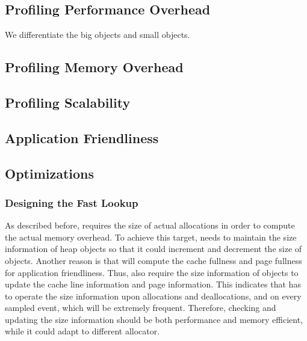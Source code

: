 \subsection{Profiling Performance Overhead}

We differentiate the big objects and small objects. 

\subsection{Profiling Memory Overhead}

\subsection{Profiling Scalability}

\subsection{Application Friendliness}

\subsection{Optimizations}

\subsubsection{Designing the Fast Lookup}

\label{sec:fastlookup}

As described before, \MP{} requires the size of actual allocations in order to compute the actual memory overhead. To achieve this target, \MP{} needs to maintain the size information of heap objects so that it could increment and decrement the size of objects. Another reason is that \MP{} will compute the cache fullness and page fullness for application friendliness. Thus, \MP{} also require the size information of objects to update the cache line information and page information. This indicates that \MP{} has to operate the size information upon allocations and deallocations, and on every sampled event, which will be extremely frequent. Therefore, checking and updating the size information should be both performance and memory efficient, while it could adapt to different allocator. 

